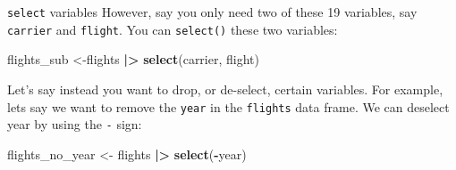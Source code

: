 \documentclass[
  ignorenonframetext,
]{beamer}
\newenvironment{Shaded}{\begin{snugshade}}{\end{snugshade}}
\newcommand{\FunctionTok}[1]{\textcolor[rgb]{0.13,0.29,0.53}{\textbf{#1}}}
\newcommand{\NormalTok}[1]{#1}
\newcommand{\OtherTok}[1]{\textcolor[rgb]{0.56,0.35,0.01}{#1}}
\newcommand{\SpecialCharTok}[1]{\textcolor[rgb]{0.81,0.36,0.00}{\textbf{#1}}}
\begin{document}
\begin{frame}[fragile]{\texttt{select} variables}
\label{select-variables-1}
However, say you only need two of these 19 variables, say
\texttt{carrier} and \texttt{flight}. You can \texttt{select()} these
two variables:

\normalsize

\begin{Shaded}
\begin{Highlighting}[]
\NormalTok{flights\_sub }\OtherTok{\textless{}{-}}\NormalTok{flights }\SpecialCharTok{|\textgreater{}} 
  \FunctionTok{select}\NormalTok{(carrier, flight)}
\end{Highlighting}
\end{Shaded}

\normalsize

Let's say instead you want to drop, or de-select, certain variables. For
example, lets say we want to remove the \texttt{year} in the
\texttt{flights} data frame. We can deselect year by using the
\texttt{-} sign:

\normalsize

\begin{Shaded}
\begin{Highlighting}[]
\NormalTok{flights\_no\_year }\OtherTok{\textless{}{-}}\NormalTok{ flights }\SpecialCharTok{|\textgreater{}} \FunctionTok{select}\NormalTok{(}\SpecialCharTok{{-}}\NormalTok{year)}
\end{Highlighting}
\end{Shaded}

\normalsize
\end{frame}
\end{document}
